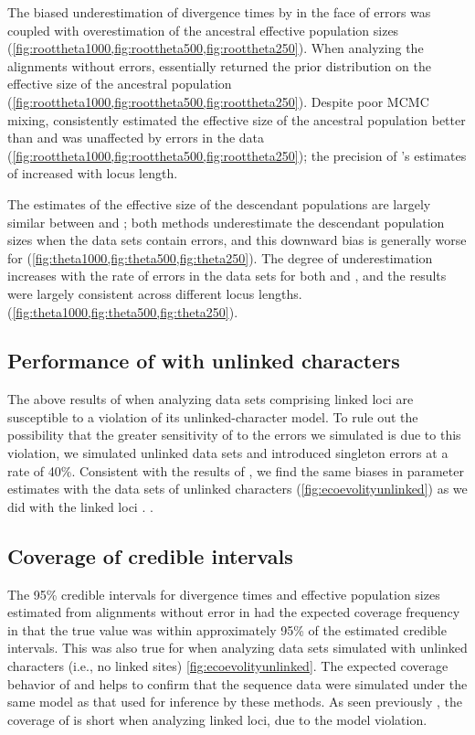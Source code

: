The biased underestimation of divergence times by \ecoevolity in the face of
errors was coupled with overestimation of the ancestral effective population
sizes (\cref{fig:roottheta1000,fig:roottheta500,fig:roottheta250}).
When analyzing the alignments without errors, \ecoevolity essentially returned
the prior distribution on the effective size of the ancestral population
(\cref{fig:roottheta1000,fig:roottheta500,fig:roottheta250}).
Despite poor MCMC mixing, \beast consistently estimated the effective size of
the ancestral population better than \ecoevolity and was unaffected by errors
in the data
(\cref{fig:roottheta1000,fig:roottheta500,fig:roottheta250});
the precision of \beast's estimates of \rootpopsize increased with locus
length.

The estimates of the effective size of the descendant populations
are largely similar between \beast and \ecoevolity;
both methods underestimate the descendant population sizes when
the data sets contain errors, and this downward bias is generally
worse for \ecoevolity
(\cref{fig:theta1000,fig:theta500,fig:theta250}).
The degree of underestimation increases with the rate of errors in the data
sets for both \beast and \ecoevolity, and the results were largely consistent
across different locus lengths.
(\cref{fig:theta1000,fig:theta500,fig:theta250}).

\subsection{Performance of \ecoevolity with unlinked characters}
The above results of \ecoevolity when analyzing data sets comprising linked
loci are susceptible to a violation of its unlinked-character model.
To rule out the possibility that the greater sensitivity of \ecoevolity to the
errors we simulated is due to this violation, we simulated unlinked data sets
and introduced singleton errors at a rate of 40\%.
Consistent with the results of \citet{Oaks2018ecoevolity}, we find the same
biases in parameter estimates with the data sets of unlinked characters
(\cref{fig:ecoevolityunlinked}) as we did with the linked loci \timefigsp.
.

\subsection{Coverage of credible intervals}
The 95\% credible intervals for divergence times and effective population sizes
estimated from alignments without error in \beast had the expected coverage
frequency in that the true value was within approximately 95\% of the estimated
credible intervals. 
This was also true for \ecoevolity when analyzing data sets simulated with
unlinked characters (i.e., no linked sites) \cref{fig:ecoevolityunlinked}.
The expected coverage behavior of \beast and \ecoevolity helps to confirm that
the sequence data were simulated under the same model as that used for
inference by these methods. 
As seen previously \citep{Oaks2018ecoevolity}, the coverage of \ecoevolity is
short when analyzing linked loci, due to the model violation.


